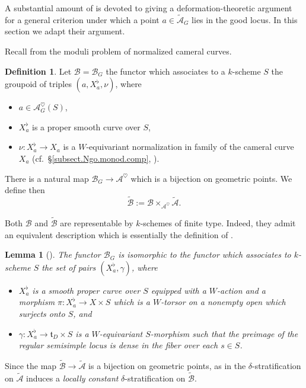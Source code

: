 \documentclass[openany]{amsbook}
\newtheorem{lemma}[theorem]{Lemma}
\theoremstyle{definition}
\newtheorem{definition}[theorem]{Definition}
\theoremstyle{remark}
\numberwithin{equation}{section}
\newcommand{\cA}{\mathcal{A}}
\newcommand{\cB}{\mathcal{B}}
\renewcommand{\-}{\operatorname{-}}
\newcommand{\ctA}{\widetilde{\cA}}
\newcommand{\ctB}{\widetilde{\cB}}
\newcommand{\ft}{\mathfrak{t}}
\begin{document}
A substantial amount of \cite[\S 9]{CLII} is devoted to giving a deformation-theoretic argument for a general criterion under which a point $a \in \ctA_G$ lies in the good locus. In this section we adapt their argument.

Recall from \cite[\S 5.2]{ngofl} the moduli problem of normalized cameral curves.

\begin{definition}
    Let $\cB = \cB_G$ the functor which associates to a $k$-scheme $S$ the groupoid of triples
    $(a, X_a^\flat, \nu)$, where
    \begin{itemize}
        \item $a \in \cA^{\heartsuit}_G(S)$,
        \item $X_a^\flat$ is a proper smooth curve over $S$,
        \item $\nu : X_a^\flat \to X_a$ is a $W$-equivariant normalization in family of the cameral curve $X_a$ (cf.\ \S \ref{subsect.Ngo.monod.comp}, \cite[\S 5.1]{ngofl}). 
    \end{itemize}
    There is a natural map $\cB_G \to \cA^{\heartsuit}$ which is a bijection on geometric points. We define then
    $$
        \ctB := \cB \times_{\cA^{\heartsuit}} \ctA.
    $$
    
\end{definition}
Both $\cB$ and $\ctB$ are representable by $k$-schemes of finite type. Indeed, they admit an equivalent description which is essentially the definition of \cite{CLII}.

\begin{lemma}[{\cite[Lemme 5.2.2]{ngofl}}]\label{lem.CL.presentation.cB}
    The functor $\cB_G$ is isomorphic to the functor which associates to $k$-scheme $S$ the set of pairs $(X_a^\flat, \gamma)$, where
    \begin{itemize}
        \item $X_a^\flat$ is a smooth proper curve over $S$ equipped with a $W$-action and a morphism $\pi : X_a^\flat \to X \times S$ which is a $W$-torsor on a nonempty open which surjects onto $S$, and
        \item $\gamma : X_a^\flat \to \ft_D \times S$ is a $W$-equivariant $S$-morphism such that the preimage of the regular semisimple locus is dense in the fiber over each $s \in S$.
    \end{itemize}
\end{lemma}

Since the map $\ctB \to \ctA$ is a bijection on geometric points, as in \cite[\S 5.4-5.6]{ngofl} the $\delta$-stratification on $\ctA$ induces a \emph{locally constant} $\delta$-stratification on $\ctB$.
\end{document}
